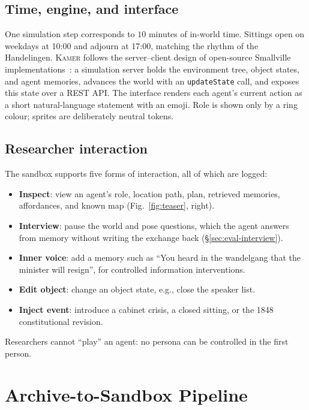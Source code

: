 \documentclass[sigconf,review,anonymous]{acmart}
\newcommand{\sys}{\textsc{Kamer}}
\begin{document}
\subsection{Time, engine, and interface}

One simulation step corresponds to $10$ minutes of in-world time.
Sittings open on weekdays at 10:00 and adjourn at 17:00, matching the
rhythm of the Handelingen. \sys{} follows the server--client design of
open-source Smallville implementations~\cite{smallvillerepo}: a simulation
server holds the environment tree, object states, and agent memories,
advances the world with an \texttt{updateState} call, and exposes this
state over a REST API. The interface renders each agent's current action as
a short natural-language statement with an emoji. Role is shown only by a
ring colour; sprites are deliberately neutral tokens.

\subsection{Researcher interaction}

The sandbox supports five forms of interaction, all of which are logged:
\begin{itemize}[leftmargin=*,nosep]
\item \textbf{Inspect}: view an agent's role, location path, plan,
retrieved memories, affordances, and known map (Fig.~\ref{fig:teaser}, right).
\item \textbf{Interview}: pause the world and pose questions, which the
agent answers from memory without writing the exchange back
(\S\ref{sec:eval-interview}).
\item \textbf{Inner voice}: add a memory such as ``You heard in the
wandelgang that the minister will resign'', for controlled information
interventions.
\item \textbf{Edit object}: change an object state, e.g., close the speaker list.
\item \textbf{Inject event}: introduce a cabinet crisis, a closed sitting,
or the 1848 constitutional revision.
\end{itemize}
Researchers cannot ``play'' an agent: no persona can be controlled in the
first person.

\section{Archive-to-Sandbox Pipeline}
\label{sec:pipeline}
\end{document}
